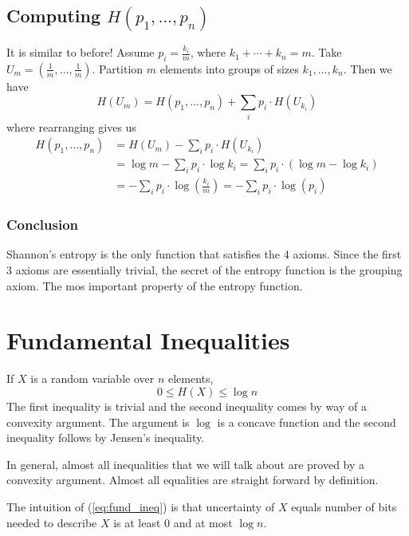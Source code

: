 \documentclass{article}
\begin{document}
\subsection{Computing $H\left(p_1,\ldots, p_n\right)$}

It is similar to before! Assume $p_i=\frac{k_i}{m}$, where $k_1+\cdots+k_n = m$. Take $U_m=\left(\frac{1}{m},\ldots,\frac{1}{m}\right)$. Partition $m$ elements into groups of sizes $k_1,\ldots,k_n$. Then we have 
\[
H(U_m) = H(p_1,\ldots, p_n)+ \sum_i p_i\cdot H(U_{k_i})
\]
where rearranging gives us 
\begin{align*}
    H(p_1,\ldots, p_n) &= H(U_m) - \sum_i p_i\cdot H(U_{k_i})\\
    &= \log m - \sum_i p_i\cdot \log k_i = \sum_i p_i\cdot \left(\log m - \log k_i\right)\\
    &= -\sum_i p_i\cdot \log\left(\frac{k_i }{m}\right) = -\sum_i p_i\cdot \log\left(p_i\right)
\end{align*}

\subsubsection{Conclusion}

Shannon's entropy is the only function that satisfies the 4 axioms. Since the first 3 axioms are essentially trivial, the secret of the entropy function is the grouping axiom. The mos important property of the entropy function.

\section{Fundamental Inequalities}

If $X$ is a random variable over $n$ elements,
\begin{equation}\label{eq:fund_ineq}
    0\leq H(X) \leq \log n 
\end{equation}
The first inequality is trivial and the second inequality comes by way of a convexity argument. The argument is $\log$ is a concave function and the second inequality follows by Jensen's inequality.

In general, almost all inequalities that we will talk about are proved by a convexity argument. Almost all equalities are straight forward by definition.

The intuition of (\ref{eq:fund_ineq}) is that uncertainty of $X$ equals number of bits needed to describe $X$ is at least $0$ and at most $\log n$.
\end{document}

